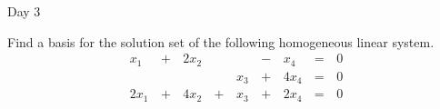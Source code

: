 \begin{applicationActivities}{Day 3}
\begin{activity}{10}
  Find a basis for the solution set of the following homogeneous linear
  system.
  \begin{alignat*}{5}
    x_1 &\,+\,& 2x_2 &\, \,&     &\,-\,&  x_4 &\,=\,& 0 \\
        &\, \,&      &\, \,& x_3 &\,+\,& 4x_4 &\,=\,& 0 \\
   2x_1 &\,+\,& 4x_2 &\,+\,& x_3 &\,+\,& 2x_4 &\,=\,& 0 \\
  \end{alignat*}
\end{activity}




\end{applicationActivities}
